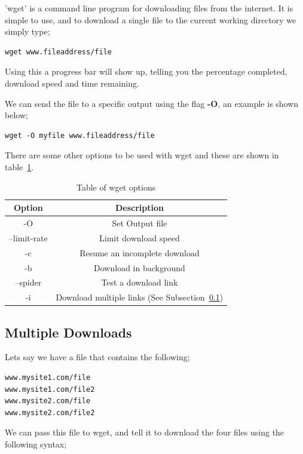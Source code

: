 'wget' is a command line program for downloading files from the internet.  It is simple to use, and to download a single file to the current working directory we simply type;

\begin{lstlisting}
wget www.fileaddress/file
\end{lstlisting}

Using this a progress bar will show up, telling you the percentage completed, download speed and time remaining.

We can send the file to a specific output using the flag \textbf{-O}, an example is shown below;

\begin{lstlisting}
wget -O myfile www.fileaddress/file
\end{lstlisting}

There are some other options to be used with wget and these are shown in table~\ref{tab:wget}.

\begin{table}[!th]
\centering
\begin{tabular}{cc}
\hline
Option & Description\\
\hline
-O & Set Output file\\
--limit-rate & Limit download speed\\
-c & Resume an incomplete download\\
-b & Download in background\\
--spider & Test a download link\\
-i & Download multiple links (See Subsection~\ref{ssec:multidown})\\
\hline
\end{tabular}
\caption{Table of wget options}
\label{tab:wget}
\end{table}

\subsection{Multiple Downloads}
\label{ssec:multidown}

Lets say we have a file that contains the following;

\begin{verbatim}
www.mysite1.com/file
www.mysite1.com/file2
www.mysite2.com/file
www.mysite2.com/file2
\end{verbatim}

We can pass this file to wget, and tell it to download the four files using the following syntax;

